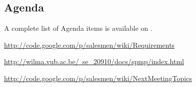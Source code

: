 \documentclass[a4paper, 12pt]{article}
\begin{document}
		\subsection{Agenda}
A complete list of Agenda items is available on \cite{site3}.
	
	\begin{thebibliography}{99}
	
		\href{http://code.google.com/p/salesmen/wiki/Requirements}{http://code.google.com/p/salesmen/wiki/Requirements}
		
		\href{http://wilma.vub.ac.be/~se\_{}20910/docs/spmp/index.html}{http://wilma.vub.ac.be/~se\_{}20910/docs/spmp/index.html}
		
		\href{http://code.google.com/p/salesmen/wiki/NextMeetingTopics}{http://code.google.com/p/salesmen/wiki/NextMeetingTopics}
		

		

		
	\end{thebibliography}	
		
\end{document}
